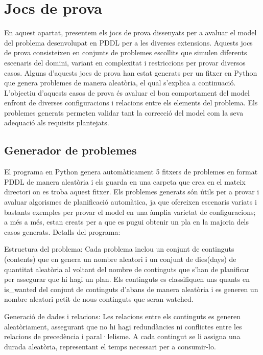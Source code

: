 \documentclass[a4paper]{article}
\begin{document}
	\newpage
	\section{Jocs de prova}
	En aquest apartat, presentem els jocs de prova dissenyats per a avaluar el model del problema desenvolupat en PDDL per a les diverses extensions. Aquests jocs de prova consisteixen en conjunts de problemes escollits que simulen diferents escenaris del domini, variant en complexitat i restriccions per provar diversos casos. Alguns d'aquests jocs de prova han estat generats per un fitxer en Python que genera problemes de manera aleatòria, el qual s'explica a continuació. L'objectiu d'aquests casos de prova és avaluar el bon comportament del model enfront de diverses configuracions i relacions entre els elements del problema. Els problemes generats permeten validar tant la correcció del model com la seva adequació als requisits plantejats. 
	

	
	\subsection{Generador de problemes}	
	
	El programa en Python genera automàticament 5 fitxers de problemes en format PDDL de manera aleatòria i els guarda en una carpeta que crea en el mateix directori on es troba aquest fitxer. Els problemes generats són útils per a provar i avaluar algorismes de planificació automàtica, ja que ofereixen escenaris variats i bastants exemples per provar el model  en una àmplia varietat de configuracions; a més a més, estan creats per a que es pugui obtenir un pla en la majoria dels casos generats. 
	Detalls del programa:
	
	Estructura del problema:
	Cada problema inclou un conjunt de continguts (contents) que en genera un nombre aleatori  i un conjunt de dies(days) de quantitat aleatòria al voltant del nombre de continguts que s'han de planificar per assegurar que hi hagi un plan. 
	Els continguts es classifiquen uns quants en is\_wanted del conjunt de continguts d'abans de manera aleatòria i es generen un nombre aleatori petit de nous continguts que seran watched.
	
	Generació de dades i relacions:
	Les relacions entre els continguts es generen aleatòriament, assegurant que no hi hagi redundàncies ni conflictes entre les relacions de precedència i paral·lelisme.
	A cada contingut se li assigna una durada aleatòria, representant el temps necessari per a consumir-lo.
	
\end{document}
